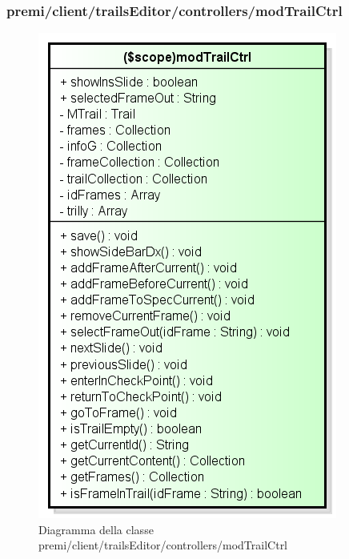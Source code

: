 \subsubsection{premi/client/trailsEditor/controllers/modTrailCtrl}
\begin{figure}[h]
\begin{center}
\includegraphics[scale=0.55]{img/diacla/modTrailCtrl.png}
\caption{Diagramma della classe premi/client/trailsEditor/controllers/modTrailCtrl}
\end{center}
\end{figure}


